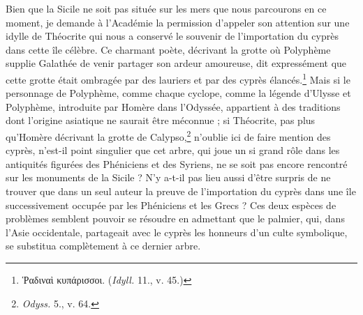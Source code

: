 \documentclass{article}
\begin{document}
Bien que la Sicile ne soit pas située sur les mers que nous parcourons en ce moment, je demande à l'Académie la permission d'appeler son attention sur une idylle de Théocrite qui nous a conservé le souvenir de l'importation du cyprès dans cette île célèbre. Ce charmant poète, décrivant la grotte où Polyphème supplie Galathée de venir partager son ardeur amoureuse, dit expressément que cette grotte était ombragée par des lauriers et par des cyprès élancés.\footnote{\textgreek{Ῥαδιναὶ κυπάρισσοι}. (\emph{Idyll.} 11., v. 45.)} Mais si le personnage de Polyphème, comme chaque cyclope, comme la légende d'Ulysse et Polyphème, introduite par Homère dans l'Odyssée, appartient à des traditions dont l'origine asiatique ne saurait être méconnue ; si Théocrite, pas plus qu'Homère décrivant la grotte de Calypso,\footnote{\emph{Odyss.} 5., v. 64.} n'oublie ici de faire mention des cyprès, n'est-il point singulier que cet arbre, qui joue un si grand rôle dans les antiquités figurées des Phéniciens et des Syriens, ne se soit pas encore rencontré sur les monuments de la Sicile ? N'y a-t-il pas lieu aussi d'être surpris de ne trouver que dans un seul auteur la preuve de l'importation du cyprès dans une île successivement occupée par les Phéniciens et les Grecs ? Ces deux espèces de problèmes semblent pouvoir se résoudre en admettant que le palmier, qui, dans l'Asie occidentale, partageait avec le cyprès les honneurs d'un culte symbolique, se substitua complètement à ce dernier arbre.
\end{document}
